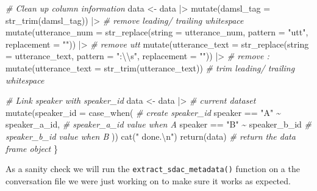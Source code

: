 \documentclass[
  letterpaper,
  DIV=11,
  numbers=noendperiod]{scrreport}
\newenvironment{Shaded}{\begin{snugshade}}{\end{snugshade}}
\newcommand{\AttributeTok}[1]{\textcolor[rgb]{0.00,0.00,0.00}{#1}}
\newcommand{\CommentTok}[1]{\textcolor[rgb]{0.00,0.00,0.00}{\textit{#1}}}
\newcommand{\FunctionTok}[1]{\textcolor[rgb]{0.00,0.00,0.00}{#1}}
\newcommand{\NormalTok}[1]{\textcolor[rgb]{0.00,0.00,0.00}{#1}}
\newcommand{\OtherTok}[1]{\textcolor[rgb]{0.00,0.00,0.00}{#1}}
\newcommand{\SpecialCharTok}[1]{\textcolor[rgb]{0.00,0.00,0.00}{#1}}
\newcommand{\StringTok}[1]{\textcolor[rgb]{0.00,0.00,0.00}{#1}}
\theoremstyle{definition}
\theoremstyle{remark}
\begin{document}
\begin{Shaded}
\begin{Highlighting}[]
  \CommentTok{\# Clean up column information}
\NormalTok{  data }\OtherTok{\textless{}{-}} 
\NormalTok{    data }\SpecialCharTok{|\textgreater{}} 
    \FunctionTok{mutate}\NormalTok{(}\AttributeTok{damsl\_tag =} \FunctionTok{str\_trim}\NormalTok{(damsl\_tag)) }\SpecialCharTok{|\textgreater{}} \CommentTok{\# remove leading/ trailing whitespace}
    \FunctionTok{mutate}\NormalTok{(}\AttributeTok{utterance\_num =} \FunctionTok{str\_replace}\NormalTok{(}\AttributeTok{string =}\NormalTok{ utterance\_num, }\AttributeTok{pattern =} \StringTok{"utt"}\NormalTok{, }\AttributeTok{replacement =} \StringTok{""}\NormalTok{)) }\SpecialCharTok{|\textgreater{}} \CommentTok{\# remove \textquotesingle{}utt\textquotesingle{}}
    \FunctionTok{mutate}\NormalTok{(}\AttributeTok{utterance\_text =} \FunctionTok{str\_replace}\NormalTok{(}\AttributeTok{string =}\NormalTok{ utterance\_text, }\AttributeTok{pattern =} \StringTok{":}\SpecialCharTok{\textbackslash{}\textbackslash{}}\StringTok{s"}\NormalTok{, }\AttributeTok{replacement =} \StringTok{""}\NormalTok{)) }\SpecialCharTok{|\textgreater{}} \CommentTok{\# remove \textquotesingle{}: \textquotesingle{}}
    \FunctionTok{mutate}\NormalTok{(}\AttributeTok{utterance\_text =} \FunctionTok{str\_trim}\NormalTok{(utterance\_text)) }\CommentTok{\# trim leading/ trailing whitespace}
  
  \CommentTok{\# Link speaker with speaker\_id}
\NormalTok{  data }\OtherTok{\textless{}{-}} 
\NormalTok{    data }\SpecialCharTok{|\textgreater{}} \CommentTok{\# current dataset}
    \FunctionTok{mutate}\NormalTok{(}\AttributeTok{speaker\_id =} \FunctionTok{case\_when}\NormalTok{( }\CommentTok{\# create speaker\_id}
\NormalTok{      speaker }\SpecialCharTok{==} \StringTok{"A"} \SpecialCharTok{\textasciitilde{}}\NormalTok{ speaker\_a\_id, }\CommentTok{\# speaker\_a\_id value when A}
\NormalTok{      speaker }\SpecialCharTok{==} \StringTok{"B"} \SpecialCharTok{\textasciitilde{}}\NormalTok{ speaker\_b\_id }\CommentTok{\# speaker\_b\_id value when B}
\NormalTok{    ))}
  \FunctionTok{cat}\NormalTok{(}\StringTok{" done.}\SpecialCharTok{\textbackslash{}n}\StringTok{"}\NormalTok{)}
  \FunctionTok{return}\NormalTok{(data) }\CommentTok{\# return the data frame object}
\NormalTok{\}}
\end{Highlighting}
\end{Shaded}

As a sanity check we will run the \texttt{extract\_sdac\_metadata()}
function on a the conversation file we were just working on to make sure
it works as expected.
\end{document}
